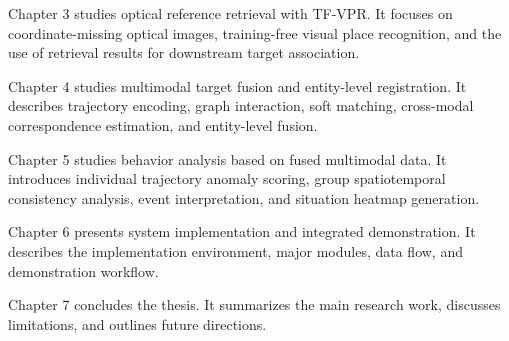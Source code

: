 Chapter 3 studies optical reference retrieval with TF-VPR. It focuses on coordinate-missing optical images, training-free visual place recognition, and the use of retrieval results for downstream target association.

Chapter 4 studies multimodal target fusion and entity-level registration. It describes trajectory encoding, graph interaction, soft matching, cross-modal correspondence estimation, and entity-level fusion.

Chapter 5 studies behavior analysis based on fused multimodal data. It introduces individual trajectory anomaly scoring, group spatiotemporal consistency analysis, event interpretation, and situation heatmap generation.

Chapter 6 presents system implementation and integrated demonstration. It describes the implementation environment, major modules, data flow, and demonstration workflow.

Chapter 7 concludes the thesis. It summarizes the main research work, discusses limitations, and outlines future directions.
